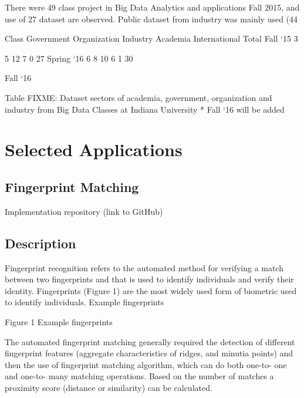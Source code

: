 \documentclass[9pt,twocolumn,twoside]{styles/osajnl}
\begin{document}
There were 49 class project in Big Data Analytics and applications Fall 2015, and use of 27 dataset are observed. Public dataset from industry was mainly used (44%


Class
	Government
	Organization
	Industry
	Academia
	International
	Total
	Fall ‘15
	3

	5
	12
	7
	0
	27
	Spring ‘16
	6
	8
	10
	6
	1
	30

	Fall ‘16
	

	

	

	

	

	

	Table FIXME: Dataset sectors of academia, government, organization and industry from Big Data Classes at Indiana University * Fall ‘16 will be added



\section{Selected Applications}

\subsection{Fingerprint Matching}

Implementation repository (link to GitHub)

\subsection{Description}

Fingerprint recognition refers to the automated method for verifying a match between two fingerprints and that is used to identify individuals and verify their identity. Fingerprints (Figure 1) are the most widely used form of biometric used to identify individuals.
 Example fingerprints 

Figure 1 Example fingerprints


The automated fingerprint matching generally required the detection of different fingerprint features (aggregate characteristics of ridges, and minutia points) and then the use of fingerprint matching algorithm, which can do both one-to- one and one-to- many matching operations. Based on the number of matches a proximity score (distance or similarity) can be calculated.
\end{document}
